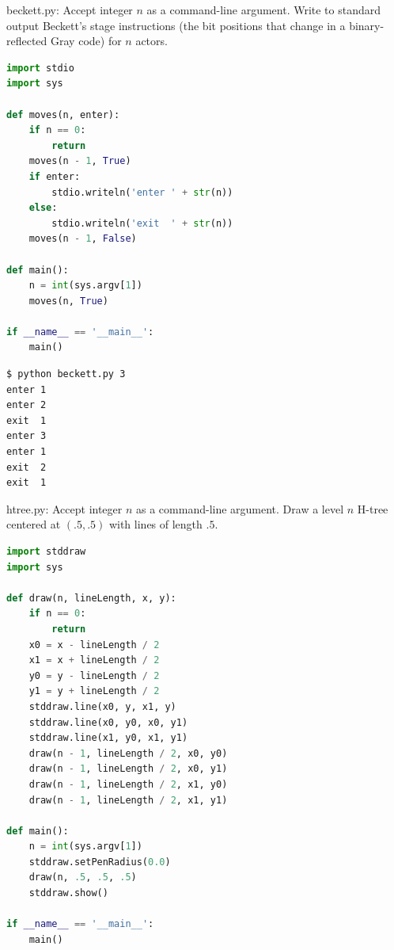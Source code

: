 \documentclass[8pt,a4paper,compress,handout]{beamer}
\begin{document}
\begin{frame}[fragile]
\begin{framed}
\tiny beckett.py: Accept integer $n$ as a command-line argument. Write to standard output Beckett's stage instructions (the bit positions that change in a binary-reflected Gray code) for $n$ actors.
\end{framed}

\begin{lstlisting}[language=Python]
import stdio
import sys

def moves(n, enter):
    if n == 0:
        return
    moves(n - 1, True)
    if enter:
        stdio.writeln('enter ' + str(n))
    else:
        stdio.writeln('exit  ' + str(n))
    moves(n - 1, False)

def main():
    n = int(sys.argv[1])
    moves(n, True)

if __name__ == '__main__':
    main()
\end{lstlisting}

\begin{lstlisting}[language={}]
$ python beckett.py 3
enter 1
enter 2
exit  1
enter 3
enter 1
exit  2
exit  1
\end{lstlisting}
\end{frame}

\begin{frame}[fragile]
\begin{framed}
\tiny htree.py: Accept integer $n$ as a command-line argument. Draw a level $n$ H-tree centered at $(.5, .5)$ with lines of length $.5$.
\end{framed}

\begin{lstlisting}[language=Python]
import stddraw
import sys

def draw(n, lineLength, x, y):
    if n == 0:
        return
    x0 = x - lineLength / 2
    x1 = x + lineLength / 2
    y0 = y - lineLength / 2
    y1 = y + lineLength / 2
    stddraw.line(x0, y, x1, y)
    stddraw.line(x0, y0, x0, y1)
    stddraw.line(x1, y0, x1, y1)
    draw(n - 1, lineLength / 2, x0, y0)
    draw(n - 1, lineLength / 2, x0, y1)
    draw(n - 1, lineLength / 2, x1, y0)
    draw(n - 1, lineLength / 2, x1, y1)

def main():
    n = int(sys.argv[1])
    stddraw.setPenRadius(0.0)
    draw(n, .5, .5, .5)
    stddraw.show()

if __name__ == '__main__':
    main()
\end{lstlisting}
\end{frame}
\end{document}

